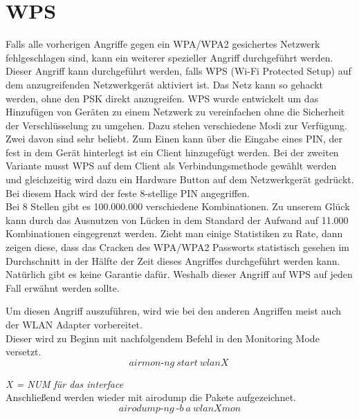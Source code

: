

\section{WPS}

Falls alle vorherigen Angriffe gegen ein WPA/WPA2 gesichertes Netzwerk fehlgeschlagen sind, kann ein weiterer spezieller Angriff durchgeführt werden. Dieser Angriff kann durchgeführt werden, falls WPS (Wi-Fi Protected Setup) auf dem anzugreifenden Netzwerkgerät aktiviert ist. Das Netz kann so gehackt werden, ohne den PSK direkt anzugreifen. WPS wurde entwickelt um das Hinzufügen von Geräten zu einem Netzwerk zu vereinfachen ohne die Sicherheit der Verschlüsselung zu umgehen. Dazu stehen verschiedene Modi zur Verfügung. Zwei davon sind sehr beliebt. Zum Einen kann über die Eingabe eines PIN, der fest in dem Gerät hinterlegt ist ein Client hinzugefügt werden. Bei der zweiten Variante musst WPS auf dem Client als Verbindungsmethode gewählt werden und gleichzeitig wird dazu ein Hardware Button auf dem Netzwerkgerät gedrückt. Bei diesem Hack wird der feste 8-stellige PIN angegriffen. \\

Bei 8 Stellen gibt es 100.000.000 verschiedene Kombinationen. Zu unserem Glück kann durch das Ausnutzen von Lücken in dem Standard der Aufwand auf 11.000 Kombinationen eingegrenzt werden. Zieht man einige Statistiken zu Rate, dann zeigen diese, dass das Cracken des WPA/WPA2 Passworts statistisch gesehen im Durchschnitt in der Hälfte der Zeit dieses Angriffes durchgeführt werden kann. Natürlich gibt es keine Garantie dafür. Weshalb dieser Angriff auf WPS auf jeden Fall erwähnt werden sollte. 

Um diesen Angriff auszuführen, wird wie bei den anderen Angriffen meist auch der WLAN Adapter vorbereitet.\\

Dieser wird zu Beginn mit nachfolgendem Befehl in den Monitoring Mode versetzt.\\

$$airmon\text{-}ng~start~wlanX~$$

\textit{X = NUM für das interface}\\


Anschließend werden wieder mit airodump die Pakete aufgezeichnet. \\

$$airodump\text{-}ng~\text{-}b~a~wlanXmon$$\\
	 
